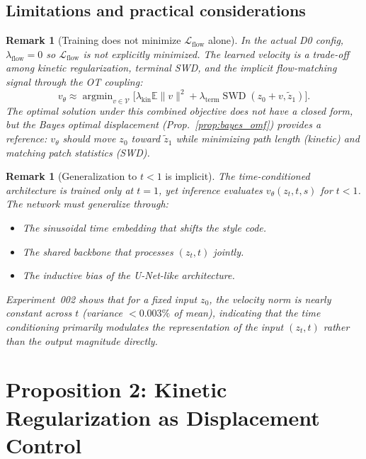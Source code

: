 \documentclass[letterpaper]{article}
\newtheorem{remark}[proposition]{Remark}
\newcommand{\E}{\mathbb{E}}
\newcommand{\SWD}{\operatorname{SWD}}
\newcommand{\cL}{\mathcal{L}}
\newcommand{\argmin}{\operatorname{argmin}}
\begin{document}
\subsection{Limitations and practical considerations}

\begin{remark}[Training does not minimize $\cL_{\text{flow}}$ alone]
In the actual D0 config, $\lambda_{\text{flow}}=0$ so $\cL_{\text{flow}}$
is not explicitly minimized. The learned velocity is a trade-off among
kinetic regularization, terminal SWD, and the implicit flow-matching
signal through the OT coupling:
\begin{equation}
    v_\theta \approx \argmin_{v\in\mathcal{V}}
    \bigl[ \lambda_{\text{kin}}\E\|v\|^2 + \lambda_{\text{term}}\SWD(z_0+v, \tilde z_1) \bigr].
\end{equation}
The optimal solution under this combined objective does not have a closed
form, but the Bayes optimal displacement (Prop.~\ref{prop:bayes_omf})
provides a reference: $v_\theta$ should move $z_0$ toward $\tilde z_1$
while minimizing path length (kinetic) and matching patch statistics (SWD).
\end{remark}

\begin{remark}[Generalization to $t<1$ is implicit]
The time-conditioned architecture is trained only at $t=1$, yet inference
evaluates $v_\theta(z_t,t,s)$ for $t<1$. The network must generalize
through:
\begin{itemize}[nosep]
    \item The sinusoidal time embedding that shifts the style code.
    \item The shared backbone that processes $(z_t, t)$ jointly.
    \item The inductive bias of the U-Net-like architecture.
\end{itemize}
Experiment~002 shows that for a \emph{fixed input} $z_0$, the velocity norm
is nearly constant across $t$ (variance $<0.003\%$ of mean), indicating that
the time conditioning primarily modulates the representation of the input
$(z_t, t)$ rather than the output magnitude directly.
\end{remark}


\section{Proposition 2: Kinetic Regularization as Displacement Control}
\end{document}

